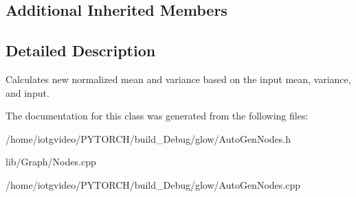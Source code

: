 \subsection*{Additional Inherited Members}


\subsection{Detailed Description}
Calculates new normalized mean and variance based on the input mean, variance, and input. 

The documentation for this class was generated from the following files\+:\begin{DoxyCompactItemize}
\item 
/home/iotgvideo/\+P\+Y\+T\+O\+R\+C\+H/build\+\_\+\+Debug/glow/Auto\+Gen\+Nodes.\+h\item 
lib/\+Graph/Nodes.\+cpp\item 
/home/iotgvideo/\+P\+Y\+T\+O\+R\+C\+H/build\+\_\+\+Debug/glow/Auto\+Gen\+Nodes.\+cpp\end{DoxyCompactItemize}
